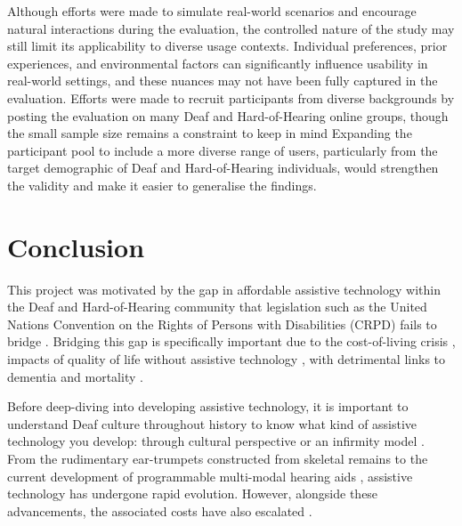 \documentclass{l4proj}
\begin{document}
Although efforts were made to simulate real-world scenarios and encourage natural interactions during the evaluation, the controlled nature of the study may still limit its applicability to diverse usage contexts. Individual preferences, prior experiences, and environmental factors can significantly influence usability in real-world settings, and these nuances may not have been fully captured in the evaluation. Efforts were made to recruit participants from diverse backgrounds by posting the evaluation on many Deaf and Hard-of-Hearing online groups, though the small sample size remains a constraint to keep in mind Expanding the participant pool to include a more diverse range of users, particularly from the target demographic of Deaf and Hard-of-Hearing individuals, would strengthen the validity and make it easier to generalise the findings.

\chapter{Conclusion}
\label{sec:conclusion}

This project was motivated by the gap in affordable assistive technology within the Deaf and Hard-of-Hearing community that legislation such as the United Nations Convention on the Rights of Persons with Disabilities (CRPD) \citep{United_Nations} fails to bridge \citep{00006479-201135010-00003}. Bridging this gap is specifically important due to the cost-of-living crisis \citep{broadbent2023public}, impacts of quality of life without assistive technology \citep{borre2023impact, ijerph18147259}, with detrimental links to dementia \citep{dementia, 10.1001/archneurol.2010.362, livingston2020dementia, loughrey2018association} and mortality \citep{choi2024association}.

Before deep-diving into developing assistive technology, it is important to understand Deaf culture throughout history to know what kind of assistive technology you develop: through cultural perspective or an infirmity model \citep{burrows2022not}. From the rudimentary ear-trumpets constructed from skeletal remains \citep{CalHearing_2023} to the current development of programmable multi-modal hearing aids \citep{shah2022novel}, assistive technology has undergone rapid evolution. However, alongside these advancements, the associated costs have also escalated \citep{Market_Research_Firm}.
\end{document}
